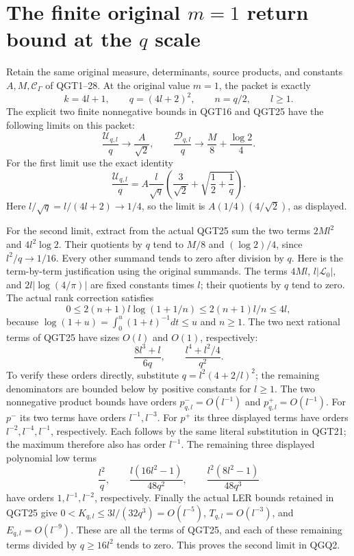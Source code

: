 \section{The finite original \(m=1\) return bound at the \(q\) scale}
\label{sec:QGQ}

Retain the same original measure, determinants, source products, and
constants $A,M,\mathcal C_\Gamma$ of QGT1--28. At the original value
$m=1$, the packet is exactly
\[
 k=4l+1,\qquad q=(4l+2)^2,\qquad n=q/2,\qquad l\ge1.
 \tag{QGQ1}
\]
The explicit two finite nonnegative bounds in QGT16 and QGT25 have
the following limits on this packet:
\[
 \frac{\mathcal U_{q,l}}q\longrightarrow\frac A{\sqrt2},
 \qquad
 \frac{\mathcal D_{q,l}}q\longrightarrow
                  \frac M8+\frac{\log2}{4}.
 \tag{QGQ2}
\]
For the first limit use the exact identity
\[
 \frac{\mathcal U_{q,l}}q
 = A\frac l{\sqrt q}
          \left(\frac3{\sqrt2}+\sqrt{\frac12+\frac1q}\right).
\]
Here $l/\sqrt q=l/(4l+2)\to1/4$, so the limit is
$A(1/4)(4/\sqrt2)$, as displayed.

For the second limit, extract from the actual QGT25 sum the two
terms $2Ml^2$ and $4l^2\log2$. Their quotients by $q$ tend to
$M/8$ and $(\log2)/4$, since $l^2/q\to1/16$.
Every other summand tends to zero after division by $q$.
Here is the term-by-term justification using the original summands.
The terms $4Ml$, $l|\mathcal L_0|$, and
$2l|\log(4/\pi)|$ are fixed constants times $l$; their quotients
by $q$ tend to zero. The actual rank correction satisfies
\[
 0\le2(n+1)l\log(1+1/n)
       \le2(n+1)l/n\le4l,
\]
because $\log(1+u)=\int_0^u(1+t)^{-1}dt\le u$ and $n\ge1$.
The two next rational terms of QGT25 have sizes $O(l)$ and $O(1)$,
respectively:
\[
 \frac{8l^3+l}{6q},\qquad\frac{l^4+l^2/4}{q^2}.
\]
To verify these orders directly, substitute
$q=l^2(4+2/l)^2$; the remaining denominators are bounded below
by positive constants for $l\ge1$.
The two nonnegative product bounds have orders
$p^-_{q,l}=O(l^{-1})$ and $p^+_{q,l}=O(l^{-1})$.
For $p^-$ its two terms have orders $l^{-1},l^{-3}$.
For $p^+$ its three displayed terms have orders
$l^{-2},l^{-4},l^{-1}$, respectively. Each follows by the same
literal substitution in QGT21; the maximum therefore also has order
$l^{-1}$.
The remaining three displayed polynomial low terms
\[
 \frac{l^2}{q},\qquad
 \frac{l(16l^2-1)}{48q^2},\qquad
 \frac{l^2(8l^2-1)}{48q^3}
\]
have orders $1,l^{-1},l^{-2}$, respectively.
Finally the actual LER bounds retained in QGT25 give
$0<K_{q,l}\le3l/(32q^3)=O(l^{-5})$,
$T_{q,l}=O(l^{-3})$, and $E_{q,l}=O(l^{-9})$.
These are all the terms of QGT25, and each of these remaining terms
divided by $q\ge16l^2$ tends to zero. This proves the second
limit in QGQ2.

